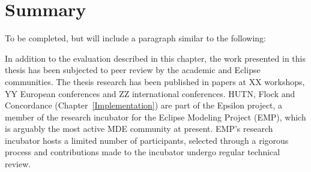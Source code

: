 






\section{Summary}
To be completed, but will include a paragraph similar to the following:

In addition to the evaluation described in this chapter, the work presented in this thesis has been subjected to peer review by the academic and Eclipse communities. The thesis research has been published in papers at XX workshops, YY European conferences and ZZ international conferences. HUTN, Flock and Concordance (Chapter~\ref{Implementation}) are part of the Epsilon project, a member of the research incubator for the Eclipse Modeling Project (EMP), which is arguably the most active MDE community at present. EMP's research incubator hosts a limited number of participants, selected through a rigorous process and contributions made to the incubator undergo regular technical review.